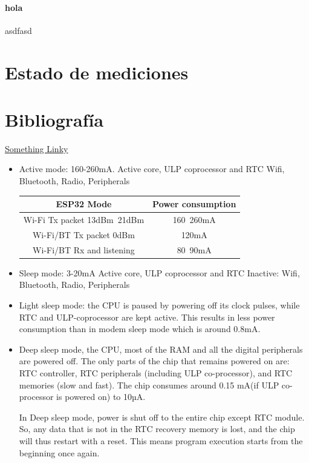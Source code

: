\documentclass[a4paper ,12pt, onecolumn]{article}
\begin{document}
\paragraph{hola}
asdfasd


\section{Estado de mediciones}

\section{Bibliografía}
\href{https://campus.masterd.es/campusvirtual/index.htm}{Something Linky} 
\begin{itemize}
    \item  Active mode: 160-260mA.  Active core, ULP coprocessor and RTC
     Wifi, Bluetooth, Radio, Peripherals
    \begin{center}
        \begin{tabular}{||c | c ||} 
        \hline
        ESP32 Mode & Power consumption  \\ [0.5ex] 
        \hline\hline
        Wi-Fi Tx packet 13dBm~21dBm & 160~260mA  \\ 
        \hline
        Wi-Fi/BT Tx packet 0dBm	 & 120mA  \\
        \hline
        Wi-Fi/BT Rx and listening & 80~90mA  \\
        \hline
       \end{tabular}
       \end{center}
    \item  Sleep mode: 3-20mA Active core, ULP coprocessor and RTC
    Inactive: Wifi, Bluetooth, Radio, Peripherals
    \item  Light sleep mode: the CPU is paused by powering off its clock 
    pulses, while RTC and ULP-coprocessor are kept active. This results in 
    less power consumption than in modem sleep mode which is around 0.8mA.

    \item Deep sleep mode, the CPU, most of the RAM and all the digital 
    peripherals are powered off. The only parts of the chip that remains 
    powered on are: RTC controller, RTC peripherals (including ULP 
    co-processor), and RTC memories (slow and fast).
    The chip consumes around 0.15 mA(if ULP co-processor is powered on) to 10µA.

    In Deep sleep mode, power is shut off to the entire chip except RTC module. So, any data that is not in the RTC recovery memory is lost, and the chip will thus restart with a reset. This means program execution starts from the beginning once again.


\end{itemize}
\end{document}
